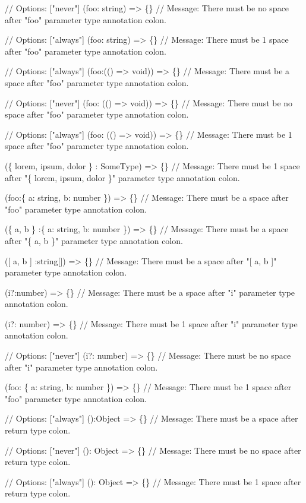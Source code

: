 \begin{DoxyCode}
// Options: ["never"]
(foo: string) => \{\}
// Message: There must be no space after "foo" parameter type annotation colon.

// Options: ["always"]
(foo:  string) => \{\}
// Message: There must be 1 space after "foo" parameter type annotation colon.

// Options: ["always"]
(foo:(() => void)) => \{\}
// Message: There must be a space after "foo" parameter type annotation colon.

// Options: ["never"]
(foo: (() => void)) => \{\}
// Message: There must be no space after "foo" parameter type annotation colon.

// Options: ["always"]
(foo:  (() => void)) => \{\}
// Message: There must be 1 space after "foo" parameter type annotation colon.

(\{ lorem, ipsum, dolor \} :   SomeType) => \{\}
// Message: There must be 1 space after "\{ lorem, ipsum, dolor \}" parameter type annotation colon.

(foo:\{ a: string, b: number \}) => \{\}
// Message: There must be a space after "foo" parameter type annotation colon.

(\{ a, b \} :\{ a: string, b: number \}) => \{\}
// Message: There must be a space after "\{ a, b \}" parameter type annotation colon.

([ a, b ] :string[]) => \{\}
// Message: There must be a space after "[ a, b ]" parameter type annotation colon.

(i?:number) => \{\}
// Message: There must be a space after "i" parameter type annotation colon.

(i?:  number) => \{\}
// Message: There must be 1 space after "i" parameter type annotation colon.

// Options: ["never"]
(i?: number) => \{\}
// Message: There must be no space after "i" parameter type annotation colon.

(foo:
  \{ a: string, b: number \}) => \{\}
// Message: There must be 1 space after "foo" parameter type annotation colon.

// Options: ["always"]
():Object => \{\}
// Message: There must be a space after return type colon.

// Options: ["never"]
(): Object => \{\}
// Message: There must be no space after return type colon.

// Options: ["always"]
():  Object => \{\}
// Message: There must be 1 space after return type colon.


\end{DoxyCode}
